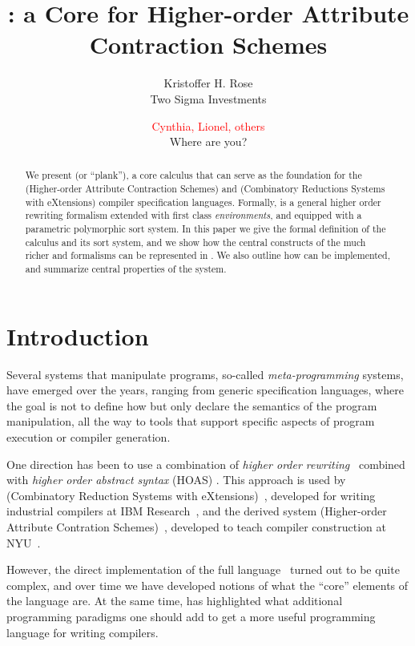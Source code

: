 \documentclass[letterpaper,11pt]{article}
\title{ \hax: a Core for Higher-order Attribute Contraction Schemes }
\author{ Kristoffer H. Rose \\
 Two Sigma Investments
 \and
 \textcolor{red}{Cynthia, Lionel, others} \\
 Where are you?
}
\begin{document}
\maketitle

\begin{abstract}\noindent
  We present \hax (or ``plank''), a core calculus that can serve as the foundation for the \HAX
  (Higher-order Attribute Contraction Schemes) and \CRSX (Combinatory Reductions Systems with
  eXtensions) compiler specification languages.
  Formally, \hax is a general higher order rewriting formalism extended with first class
  \emph{environments}, and equipped with a parametric polymorphic sort system.
  In this paper we give the formal definition of the \hax calculus and its sort system, and we show
  how the central constructs of the much richer \HAX and \CRSX formalisms can be represented in
  \hax. We also outline how \hax can be implemented, and summarize central properties of the system.
\end{abstract}

\compacttableofcontents


\section{Introduction}\label{sec:intro}

Several systems that manipulate programs, so-called \emph{meta-programming} systems, have emerged
over the years, ranging from generic specification languages, where the goal is not to define how
but only declare the semantics of the program manipulation, all the way to tools that support
specific aspects of program execution or compiler generation.

One direction has been to use a combination of \emph{higher order
  rewriting}~\cite{Jouannaud:klop2005} combined with \emph{higher order abstract syntax} (HOAS)
\cite{PfenningElliot:pldi1988}. This approach is used by \CRSX (Combinatory Reduction Systems with
eXtensions)~\cite{Rose:1996}, developed for writing industrial compilers at IBM
Research~\cite{Rose:hor2010,Rose:rta2011,dp60:ibm2013}, and the derived system \HAX (Higher-order
Attribute Contration Schemes)~\cite{Rose:ts2015}, developed to teach compiler construction at
NYU~\cite{RoseRose:cims2015}.

However, the direct implementation of the full \CRSX language~\cite{crsx} turned out to be quite
complex, and over time we have developed notions of what the ``core'' elements of the language
are. At the same time, \HAX has highlighted what additional programming paradigms one should add to
get a more useful programming language for writing compilers.
\end{document}
